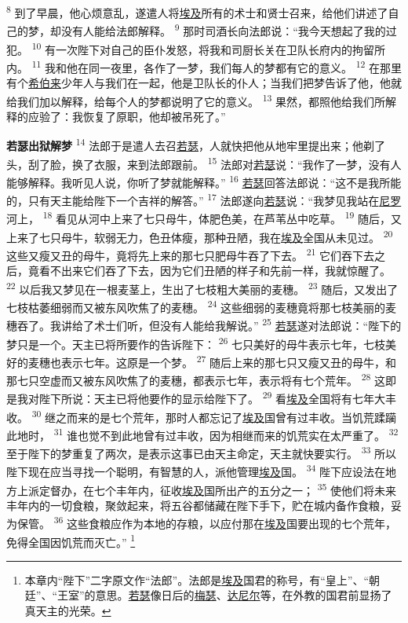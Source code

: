 \textsuperscript{8}
到了早晨，他心烦意乱，遂遣人将\uline{埃及}所有的术士和贤士召来，给他们讲述了自己的梦，却没有人能给法郎解释。
\textsuperscript{9}
那时司酒长向法郎说：“我今天想起了我的过犯。
\textsuperscript{10}
有一次陛下对自己的臣仆发怒，将我和司厨长关在卫队长府内的拘留所内。
\textsuperscript{11}
我和他在同一夜里，各作了一梦，我们每人的梦都有它的意义。
\textsuperscript{12}
在那里有个\uline{希伯来}少年人与我们在一起，他是卫队长的仆人；当我们把梦告诉了他，他就给我们加以解释，给每个人的梦都说明了它的意义。
\textsuperscript{13}
果然，都照他给我们所解释的应验了：我恢复了原职，他却被吊死了。”

\textbf{若瑟出狱解梦 }
\textsuperscript{14}
法郎于是遣人去召\uline{若瑟}，人就快把他从地牢里提出来；他剃了头，刮了脸，换了衣服，来到法郎跟前。
\textsuperscript{15}
法郎对\uline{若瑟}说：“我作了一梦，没有人能够解释。我听见人说，你听了梦就能解释。”
\textsuperscript{16}
\uline{若瑟}回答法郎说：“这不是我所能的，只有天主能给陛下一个吉祥的解答。”
\textsuperscript{17}
法郎遂向\uline{若瑟}说：“我梦见我站在\uline{尼罗}河上，
\textsuperscript{18}
看见从河中上来了七只母牛，体肥色美，在芦苇丛中吃草。
\textsuperscript{19}
随后，又上来了七只母牛，软弱无力，色丑体瘦，那种丑陋，我在\uline{埃及}全国从未见过。
\textsuperscript{20}
这些又瘦又丑的母牛，竟将先上来的那七只肥母牛吞了下去。
\textsuperscript{21}
它们吞下去之后，竟看不出来它们吞了下去，因为它们丑陋的样子和先前一样，我就惊醒了。
\textsuperscript{22}
以后我又梦见在一根麦茎上，生出了七枝粗大美丽的麦穗。
\textsuperscript{23}
随后，又发出了七枝枯萎细弱而又被东风吹焦了的麦穗。
\textsuperscript{24}
这些细弱的麦穗竟将那七枝美丽的麦穗吞了。我讲给了术士们听，但没有人能给我解说。”
\textsuperscript{25}
\uline{若瑟}遂对法郎说：“陛下的梦只是一个。天主已将所要作的告诉陛下：
\textsuperscript{26}
七只美好的母牛表示七年，七枝美好的麦穗也表示七年。这原是一个梦。
\textsuperscript{27}
随后上来的那七只又瘦又丑的母牛，和那七只空虚而又被东风吹焦了的麦穗，都表示七年，表示将有七个荒年。
\textsuperscript{28}
这即是我对陛下所说：天主已将他要作的显示给陛下了。
\textsuperscript{29}
看\uline{埃及}全国将有七年大丰收。
\textsuperscript{30}
继之而来的是七个荒年，那时人都忘记了\uline{埃及}国曾有过丰收。当饥荒蹂躏此地时，
\textsuperscript{31}
谁也觉不到此地曾有过丰收，因为相继而来的饥荒实在太严重了。
\textsuperscript{32}
至于陛下的梦重复了两次，是表示这事已由天主命定，天主就快要实行。
\textsuperscript{33}
所以陛下现在应当寻找一个聪明，有智慧的人，派他管理\uline{埃及}国。
\textsuperscript{34}
陛下应设法在地方上派定督办，在七个丰年内，征收\uline{埃及}国所出产的五分之一；
\textsuperscript{35}
使他们将未来丰年内的一切食粮，聚敛起来，将五谷都储藏在陛下手下，贮在城内备作食粮，妥为保管。
\textsuperscript{36}
这些食粮应作为本地的存粮，以应付那在\uline{埃及}国要出现的七个荒年，免得全国因饥荒而灭亡。”
\footnote{本章内“陛下”二字原文作“法郎”。法郎是\uline{埃及}国君的称号，有“皇上”、“朝廷”、“王室”的意思。\uline{若瑟}像日后的\uline{梅瑟}、\uline{达尼尔}等，在外教的国君前显扬了真天主的光荣。}

